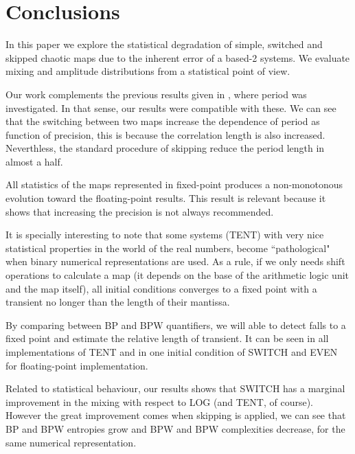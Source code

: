 \section{Conclusions}\label{sec:conclusions}
In this paper we explore the statistical degradation of simple, switched and skipped chaotic maps due to the inherent error of a based-2 systems.
We evaluate mixing and amplitude distributions from a statistical point of view.

Our work complements the previous results given in \cite{Nagaraj2008}, where period was investigated.
In that sense, our results were compatible with these.
We can see that the switching between two maps increase the dependence of period as function of precision, this is because the correlation length is also increased.
Neverthless, the standard procedure of skipping reduce the period length in almost a half.

All statistics of the maps represented in fixed-point produces a non-monotonous evolution toward the floating-point results.
This result is relevant because it shows that increasing the precision is not always recommended.

It is specially interesting to note that some systems (TENT) with very nice statistical properties in the world of the real numbers, become ``pathological" when binary numerical representations are used.
As a rule, if we only needs shift operations to calculate a map (it depends on the base of the arithmetic logic unit and the map itself), all initial conditions converges to a fixed point with a transient no longer than the length of their mantissa.

By comparing between BP and BPW quantifiers, we will able to detect falls to a fixed point and estimate the relative length of transient. It can be seen in all implementations of TENT and in one initial condition of SWITCH and EVEN for floating-point implementation.

Related to statistical behaviour, our results shows that SWITCH has a marginal improvement in the mixing with respect to LOG (and TENT, of course).
However the great improvement comes when skipping is applied, we can see that BP and BPW entropies grow and BPW and BPW complexities decrease, for the same numerical representation.
